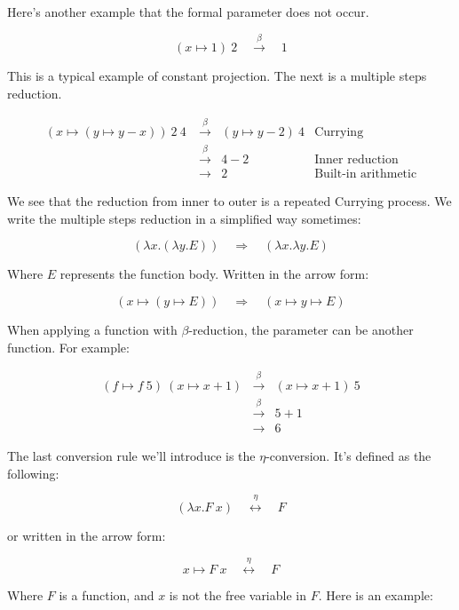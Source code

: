 \documentclass{article}
\begin{document}
Here's another example that the formal parameter does not occur.

\[
(x \mapsto 1)\ 2 \quad \overset{\beta}{\longrightarrow} \quad 1
\]

This is a typical example of constant projection. The next is a multiple steps reduction.

\[
\begin{array}{rcll}
(x \mapsto (y \mapsto y - x))\ 2\ 4\ & \overset{\beta}{\longrightarrow} & (y \mapsto y - 2)\ 4 & \text{Currying} \\
                                     & \overset{\beta}{\longrightarrow} & 4 - 2 & \text{Inner reduction} \\
                                     & \longrightarrow & 2 & \text{Built-in arithmetic}
\end{array}
\]

We see that the reduction from inner to outer is a repeated Currying process. We write the multiple steps reduction in a simplified way sometimes:

\[
(\lambda x . (\lambda y . E)) \quad \Rightarrow \quad (\lambda x . \lambda y . E)
\]

Where $E$ represents the function body. Written in the arrow form:

\[
(x \mapsto (y \mapsto E)) \quad \Rightarrow \quad (x \mapsto y \mapsto E)
\]

When applying a function with $\beta$-reduction, the parameter can be another function. For example:

\[
\begin{array}{rcl}
(f \mapsto f\ 5)\ (x \mapsto x + 1) & \overset{\beta}{\longrightarrow} & (x \mapsto x + 1)\ 5 \\
                                    & \overset{\beta}{\longrightarrow} & 5 + 1 \\
                                    & \longrightarrow & 6
\end{array}
\]

The last conversion rule we'll introduce is the $\eta$-conversion. It's defined as the following:

\[
(\lambda x . F\ x) \quad \overset{\eta}{\longleftrightarrow} \quad F
\]

or written in the arrow form:

\[
x \mapsto F\ x \quad \overset{\eta}{\longleftrightarrow} \quad F
\]

Where $F$ is a function, and $x$ is not the free variable in $F$. Here is an example:
\end{document}
